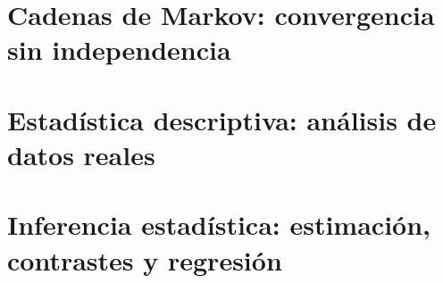 \documentclass[11pt, a4paper]{article}
\begin{document}


\setcounter{page}{1}

\tableofcontents
\newpage

\section{Cadenas de Markov: convergencia sin independencia}
% 

\section{Estadística descriptiva: análisis de datos reales}
% 

\section{Inferencia estadística: estimación, contrastes y regresión}
% 
\end{document}
